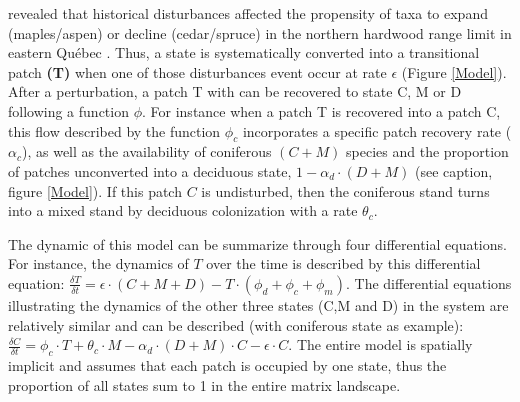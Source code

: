 revealed that historical disturbances affected the propensity of taxa to
expand (maples/aspen) or decline (cedar/spruce) in the northern hardwood range
limit in eastern Québec \cite{Dupuis2011}. Thus, a state is systematically
converted into a transitional patch \textbf{(T)} when one of those
disturbances event occur at rate $\epsilon$ (Figure \ref{Model}). After a
perturbation, a patch T with can be recovered to state C, M or D following a
function $\phi$. For instance when a patch T is recovered into a patch C, this
flow described by the function $\phi_c$ incorporates a specific patch recovery
rate ($\alpha_c$), as well as the availability of coniferous $(C + M)$ species
and the proportion of patches unconverted into a deciduous state, $1- \alpha_d
\cdot (D + M)$ (see caption, figure \ref{Model}). If this patch $C$ is
undisturbed, then the coniferous stand turns into a mixed stand by deciduous
colonization with a rate $\theta_c$.


The dynamic of this model can be summarize through four differential
equations. For instance, the dynamics of $T$ over the time is described by
this differential equation: $\frac{\delta T}{\delta t} = \epsilon \cdot
(C+M+D) - T \cdot (\phi_d + \phi_c + \phi_m)$. The differential equations
illustrating the dynamics of the other three states (C,M and D) in the system
are relatively similar and can be described (with coniferous state as
example): $\frac{\delta C}{\delta t} = \phi_c \cdot T + \theta_c \cdot M -
\alpha_d \cdot (D+M)\cdot C - \epsilon \cdot C$. The entire model is spatially
implicit and assumes that each patch is occupied by one state, thus the
proportion of all states sum to 1 in the entire matrix landscape. \\

